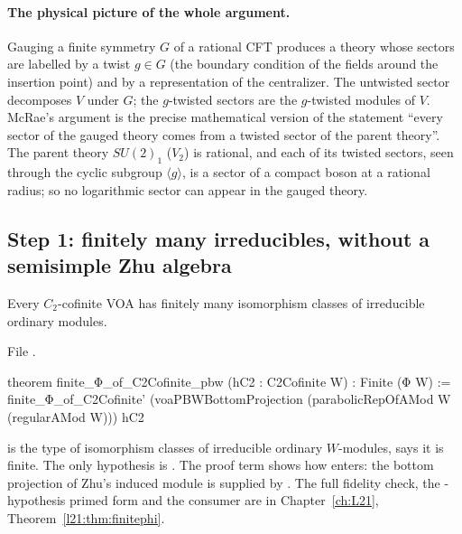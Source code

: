\paragraph{The physical picture of the whole argument.} Gauging a finite symmetry $G$ of a rational CFT produces a
theory whose sectors are labelled by a twist $g\in G$ (the boundary condition of the fields around the insertion
point) and by a representation of the centralizer. The untwisted sector decomposes $V$ under $G$; the $g$-twisted
sectors are the $g$-twisted modules of $V$. McRae's argument is the precise mathematical version of the statement
``every sector of the gauged theory comes from a twisted sector of the parent theory''. The parent theory $SU(2)_1$
($V_2$) is rational, and each of its twisted sectors, seen through the cyclic subgroup $\langle g\rangle$, is a sector of a
compact boson at a rational radius; so no logarithmic sector can appear in the gauged theory.

\subsection{Step 1: finitely many irreducibles, without a semisimple Zhu algebra}

\begin{theorem}\label{l22:thm:O1}
Every $C_2$-cofinite VOA has finitely many isomorphism classes of irreducible ordinary modules.
\end{theorem}
\noindent File .
\begin{leancode}
theorem finite_Φ_of_C2Cofinite_pbw (hC2 : C2Cofinite W) : Finite (Φ W) :=
  finite_Φ_of_C2Cofinite' (voaPBWBottomProjection (parabolicRepOfAMod W (regularAMod W))) hC2
\end{leancode}

\begin{dictionary}
 is the type of isomorphism classes of irreducible ordinary $W$-modules,  says it is finite.
The only hypothesis is . The proof term shows how  enters: the bottom projection of
Zhu's induced module is supplied by . The full fidelity check, the -hypothesis primed form
and the consumer  are in Chapter~\ref{ch:L21}, Theorem~\ref{l21:thm:finitephi}.
\end{dictionary}

